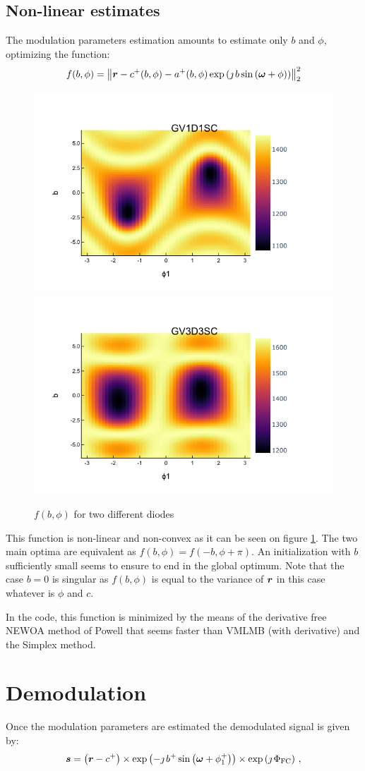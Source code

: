 \documentclass[a4paper,11pt,twoside]{scrartcl}
\begin{document}
\subsection{Non-linear estimates}
The modulation parameters estimation amounts to estimate only $b$  and $\phi$, optimizing the function:
\begin{equation}
   f(b,\phi) = \left\Vert \boldsymbol{r} -  c^+(b,\phi) - a^+(b,\phi) \exp\left( \jmath \, b \sin\left( \boldsymbol{\omega} + \phi\right)\right) \right\Vert_2^2\label{eq:nl}
\end{equation}
\begin{figure}
    \centering
    \includegraphics[width=0.45\linewidth]{figs/GV1D1SC.png}
    \includegraphics[width=0.45\linewidth]{figs/GV3D3SC.png}
    \caption{$f(b,\phi)$ for two different diodes}
    \label{fig:GV1D1SC}
\end{figure}

This function is non-linear and non-convex as it can be seen on figure \ref{fig:GV1D1SC}. The two main optima are equivalent as $f(b,\phi) =  f(-b,\phi+ \pi )$. An initialization with $b$ sufficiently small seems to ensure to end in the global optimum. Note that the case $b=0$ is singular  as $f(b,\phi)$ is equal to the variance of $\boldsymbol{r}$ in this case whatever is $\phi$  and $ c$.

In the code, this function is minimized by the means of the derivative free NEWOA method of Powell that seems faster than VMLMB (with derivative) and  the Simplex method.
\section{Demodulation}
Once the modulation parameters are estimated the demodulated signal is given by:
\begin{equation}
\boldsymbol{s} =\left(\boldsymbol{r} - c^+\right)\times\exp\left(- \jmath \, b^+ \sin\left( \boldsymbol{\omega} + \phi^+_1\right)\right)\times\exp\left(\jmath\,\Phi_\textrm{FC}\right)\,,\label{eq:demodulation}
\end{equation}
\end{document}
